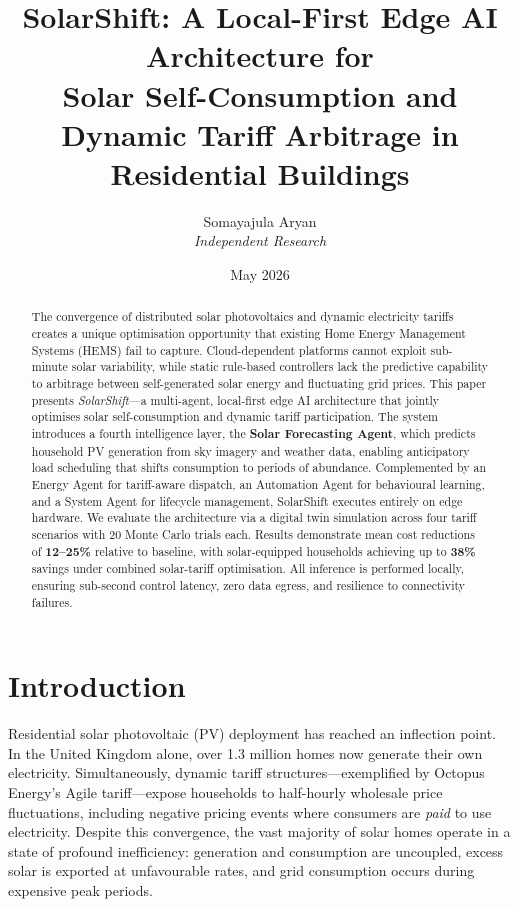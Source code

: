 \documentclass[11pt,a4paper]{article}
\title{\textbf{SolarShift: A Local-First Edge AI Architecture for\\
Solar Self-Consumption and Dynamic Tariff Arbitrage in Residential Buildings}}
\author{Somayajula Aryan\\
\textit{Independent Research}}
\date{May 2026}
\begin{document}
\maketitle

\begin{abstract}
The convergence of distributed solar photovoltaics and dynamic electricity tariffs creates a unique optimisation opportunity that existing Home Energy Management Systems (HEMS) fail to capture. Cloud-dependent platforms cannot exploit sub-minute solar variability, while static rule-based controllers lack the predictive capability to arbitrage between self-generated solar energy and fluctuating grid prices. This paper presents \textit{SolarShift}---a multi-agent, local-first edge AI architecture that jointly optimises solar self-consumption and dynamic tariff participation. The system introduces a fourth intelligence layer, the \textbf{Solar Forecasting Agent}, which predicts household PV generation from sky imagery and weather data, enabling anticipatory load scheduling that shifts consumption to periods of abundance. Complemented by an Energy Agent for tariff-aware dispatch, an Automation Agent for behavioural learning, and a System Agent for lifecycle management, SolarShift executes entirely on edge hardware. We evaluate the architecture via a digital twin simulation across four tariff scenarios with 20 Monte Carlo trials each. Results demonstrate mean cost reductions of \textbf{12--25\%} relative to baseline, with solar-equipped households achieving up to \textbf{38\%} savings under combined solar-tariff optimisation. All inference is performed locally, ensuring sub-second control latency, zero data egress, and resilience to connectivity failures.
\end{abstract}

\section{Introduction}
\label{sec:intro}

Residential solar photovoltaic (PV) deployment has reached an inflection point. In the United Kingdom alone, over 1.3 million homes now generate their own electricity. Simultaneously, dynamic tariff structures---exemplified by Octopus Energy's Agile tariff---expose households to half-hourly wholesale price fluctuations, including negative pricing events where consumers are \textit{paid} to use electricity. Despite this convergence, the vast majority of solar homes operate in a state of profound inefficiency: generation and consumption are uncoupled, excess solar is exported at unfavourable rates, and grid consumption occurs during expensive peak periods.
\end{document}
